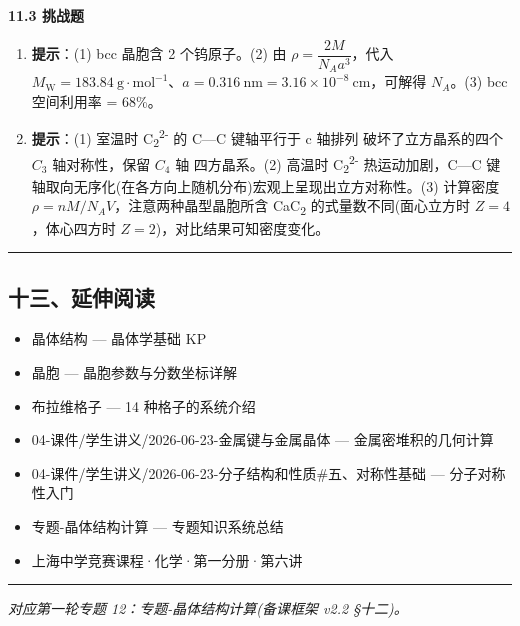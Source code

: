 \textbf{11.3 挑战题}

\begin{enumerate}
\def\labelenumi{\arabic{enumi}.}
\setcounter{enumi}{6}
\item
  \textbf{提示}：(1) bcc 晶胞含 2 个钨原子。(2) 由 \(\rho = \dfrac{2M}{N_A a^3}\)，代入 \(M_{\mathrm{W}} = 183.84\ \mathrm{g\cdot mol^{-1}}\)、\(a = 0.316\ \mathrm{nm} = 3.16\times 10^{-8}\ \mathrm{cm}\)，可解得 \(N_A\)。(3) bcc 空间利用率 = 68\%。
\item
  \textbf{提示}：(1) 室温时 C\textsubscript{2}\textsuperscript{2-} 的 C---C 键轴平行于 c 轴排列 \箭 破坏了立方晶系的四个 \(C_3\) 轴对称性，保留 \(C_4\) 轴 \箭 四方晶系。(2) 高温时 C\textsubscript{2}\textsuperscript{2-} 热运动加剧，C---C 键轴取向无序化(在各方向上随机分布)\箭 宏观上呈现出立方对称性。(3) 计算密度 \(\rho = nM/N_A V\)，注意两种晶型晶胞所含 CaC\textsubscript{2} 的式量数不同(面心立方时 \(Z = 4\)，体心四方时 \(Z = 2\))，对比结果可知密度变化。
\end{enumerate}

\begin{center}\rule{0.5\linewidth}{0.5pt}\end{center}

\subsection{十三、延伸阅读}\label{ux5341ux4e09ux5ef6ux4f38ux9605ux8bfb}

\begin{itemize}
\tightlist
\item
  晶体结构 --- 晶体学基础 KP
\item
  晶胞 --- 晶胞参数与分数坐标详解
\item
  布拉维格子 --- 14 种格子的系统介绍
\item
  04-课件/学生讲义/2026-06-23-金属键与金属晶体 --- 金属密堆积的几何计算
\item
  04-课件/学生讲义/2026-06-23-分子结构和性质\#五、对称性基础 --- 分子对称性入门
\item
  专题-晶体结构计算 --- 专题知识系统总结
\item
  上海中学竞赛课程·化学·第一分册·第六讲
\end{itemize}

\begin{center}\rule{0.5\linewidth}{0.5pt}\end{center}

\emph{对应第一轮专题 12：专题-晶体结构计算(备课框架 v2.2 §十二)。}
